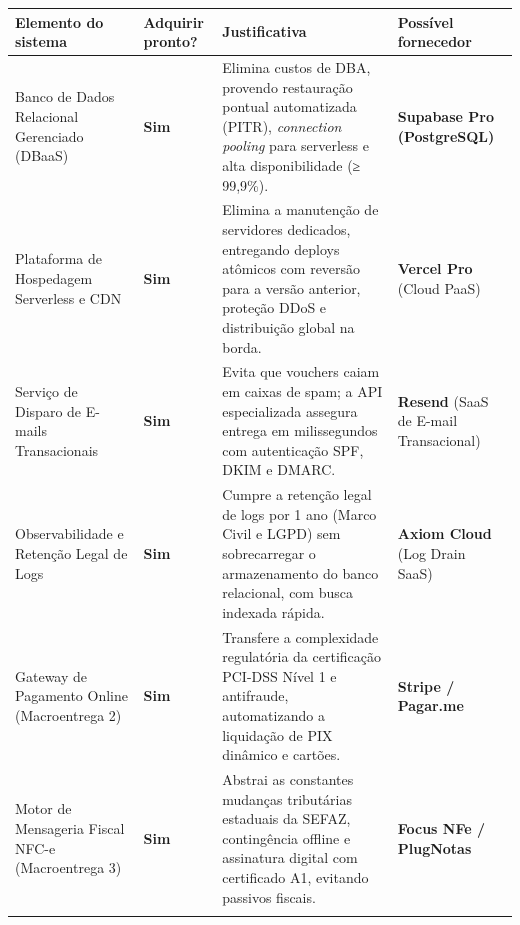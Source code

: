 {\footnotesize
\begin{tabularx}{\textwidth}{>{\fontSemiBold\color{BrandNavy}\hsize\sloppy\arraybackslash}X C{1.69cm} >{\hsize\sloppy\arraybackslash}X >{\hsize\sloppy\arraybackslash}X}
\toprule
{}
\textbf{Elemento do sistema} & \textbf{Adquirir pronto?} & \textbf{Justificativa} & \textbf{Possível fornecedor} \\
\midrule
{}
Banco de Dados Relacional Gerenciado (DBaaS) & \textbf{Sim} & Elimina custos de DBA, provendo restauração pontual automatizada (PITR), \emph{connection pooling} para serverless e alta disponibilidade (≥ 99,9\%). & \textbf{Supabase Pro (PostgreSQL)} \\
\midrule
Plataforma de Hospedagem Serverless e CDN & \textbf{Sim} & Elimina a manutenção de servidores dedicados, entregando deploys atômicos com reversão para a versão anterior, proteção DDoS e distribuição global na borda. & \textbf{Vercel Pro} (Cloud PaaS) \\
\midrule
Serviço de Disparo de E-mails Transacionais & \textbf{Sim} & Evita que vouchers caiam em caixas de spam; a API especializada assegura entrega em milissegundos com autenticação SPF, DKIM e DMARC. & \textbf{Resend} (SaaS de E-mail Transacional) \\
\midrule
Observabilidade e Retenção Legal de Logs & \textbf{Sim} & Cumpre a retenção legal de logs por 1 ano (Marco Civil e LGPD) sem sobrecarregar o armazenamento do banco relacional, com busca indexada rápida. & \textbf{Axiom Cloud} (Log Drain SaaS) \\
\midrule
Gateway de Pagamento Online (Macroentrega 2) & \textbf{Sim} & Transfere a complexidade regulatória da certificação PCI-DSS Nível 1 e antifraude, automatizando a liquidação de PIX dinâmico e cartões. & \textbf{Stripe / Pagar.me} \\
\midrule
Motor de Mensageria Fiscal NFC-e (Macroentrega 3) & \textbf{Sim} & Abstrai as constantes mudanças tributárias estaduais da SEFAZ, contingência offline e assinatura digital com certificado A1, evitando passivos fiscais. & \textbf{Focus NFe / PlugNotas} \\
\bottomrule
\end{tabularx}%
}
